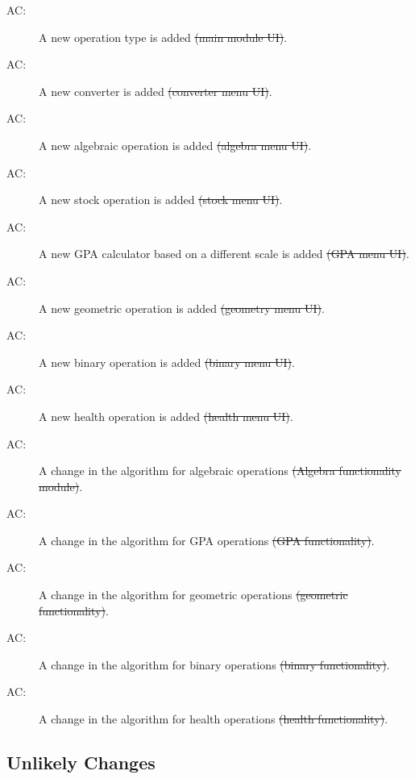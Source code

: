 \documentclass[12pt, titlepage]{article}
\newcounter{acnum}
\newcommand{\actheacnum}{AC\theacnum}
\begin{document}
\begin{description}
\item[ \actheacnum \label{acOp}:] A new operation type is added \sout{(main module UI)}.
\item[ \actheacnum \label{acCon}:] A new converter is added \sout{(converter menu UI)}.
\item[ \actheacnum \label{acAlg}:] A new algebraic operation is added \sout{(algebra menu UI)}.
\item[ \actheacnum \label{acStk}:] A new stock operation is added \sout{(stock menu UI)}.
\item[ \actheacnum \label{acGPA}:] A new GPA calculator based on a different scale is added \sout{(GPA menu UI)}.
\item[ \actheacnum \label{acGeo}:] A new geometric operation is added \sout{(geometry menu UI)}.
\item[ \actheacnum \label{acBin}:] A new binary operation is added \sout{(binary menu UI)}.
\item[ \actheacnum \label{acHlth}:] A new health operation is added \sout{(health menu UI)}.
\item[ \actheacnum \label{acAlg1}:] A change in the algorithm for algebraic operations \sout{(Algebra functionality module)}.
\item[ \actheacnum \label{acAlg2}:] A change in the algorithm for GPA operations \sout{(GPA functionality)}.
\item[ \actheacnum \label{acAlg3}:] A change in the algorithm for geometric operations \sout{(geometric functionality)}.
\item[ \actheacnum \label{acAlg4}:] A change in the algorithm for binary operations \sout{(binary functionality)}.
\item[ \actheacnum \label{acAlg5}:] A change in the algorithm for health operations \sout{(health functionality)}.





\end{description}

\subsection{Unlikely Changes} \label{SecUchange}
\end{document}
